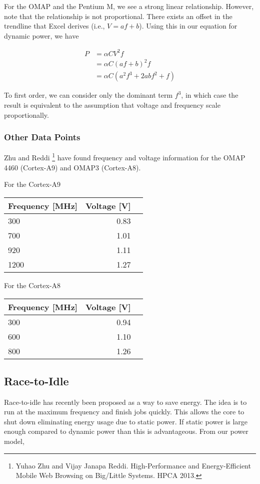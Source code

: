 \documentclass[11pt, letterpaper]{article}
\providecommand{\eq}[1]{
		\begin{align*}
		#1
		\end{align*}
	}
\begin{document}
For the OMAP and the Pentium M, we see a strong linear relationship. However,
note that the relationship is not proportional. There exists an offset in the
trendline that Excel derives (i.e., $V = af + b$). Using this in our equation for dynamic power, we have
\eq{
  P &= \alpha CV^2f \\
  &= \alpha C(af + b)^2f \\
  &= \alpha C(a^2f^3 + 2abf^2 + f)
}

To first order, we can consider only the dominant term $f^3$, in which case the
result is equivalent to the assumption that voltage and frequency scale
proportionally.

\subsubsection{Other Data Points}

Zhu and Reddi \footnote{Yuhao Zhu and Vijay Janapa Reddi. High-Performance and
Energy-Efficient Mobile Web Browsing on Big/Little Systems. HPCA 2013.} have
found frequency and voltage information for the OMAP 4460 (Cortex-A9) and OMAP3
(Cortex-A8).

For the Cortex-A9

\begin{tabular}{|l|r|r|}
\hline
Frequency [MHz] & Voltage [V] \\ \hline\hline
300 & 0.83 \\ \hline
700 & 1.01 \\ \hline
920 & 1.11 \\ \hline
1200 & 1.27 \\ \hline
\end{tabular}

For the Cortex-A8

\begin{tabular}{|l|r|r|}
\hline
Frequency [MHz] & Voltage [V] \\ \hline\hline
300 & 0.94 \\ \hline
600 & 1.10 \\ \hline
800 & 1.26 \\ \hline
\end{tabular}

\subsection{Race-to-Idle}

Race-to-idle has recently been proposed as a way to save energy. The idea is to
run at the maximum frequency and finish jobs quickly. This allows the core to
shut down eliminating energy usage due to static power. If static power is
large enough compared to dynamic power than this is advantageous.
From our power model,
\end{document}
